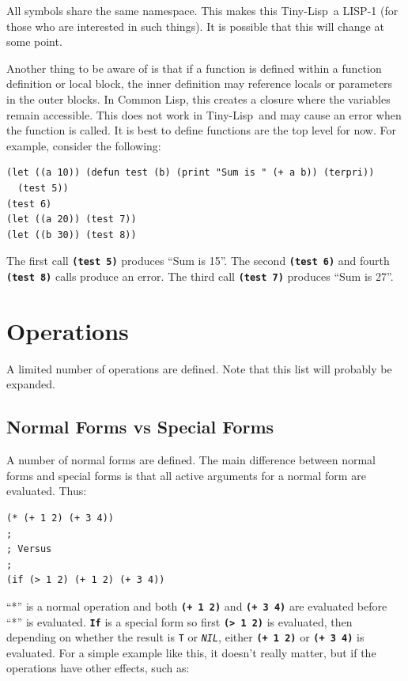 \documentclass[10pt, openany]{book}
\newcommand{\operation}[1]{\textbf{\texttt{#1}}}
\newcommand{\function}[1]{\texttt{#1}}
\newcommand{\constant}[1]{\emph{\texttt{#1}}}
\newcommand{\tl}{Tiny-Lisp}
\newcommand{\cl}{Common Lisp}
\begin{document}
All symbols share the same namespace.  This makes this \tl\ a LISP-1 (for those who are interested in such things).  It is possible that this will change at some point.

Another thing to be aware of is that if a function is defined within a function definition or local block, the inner definition may reference locals or parameters in the outer blocks.  In \cl, this creates a closure where the variables remain accessible.  This does not work in \tl\ and may cause an error when the function is called.  It is best to define functions are the top level for now.  For example, consider the following:
\begin{lstlisting}
(let ((a 10)) (defun test (b) (print "Sum is " (+ a b)) (terpri))
  (test 5))
(test 6)
(let ((a 20)) (test 7))
(let ((b 30)) (test 8))
\end{lstlisting}

The first call \operation{(test 5)} produces ``Sum is  15''.  The second \operation{(test 6)} and fourth \operation{(test 8)} calls produce an error.  The third call \operation{(test 7)} produces ``Sum is  27''.

\section{Operations}
A limited number of operations are defined.  Note that this list will probably be expanded.

\subsection{Normal Forms vs Special Forms}
A number of normal forms are defined.  The main difference between normal forms and special forms is that all active arguments for a normal form are evaluated.  Thus:
\begin{lstlisting}
(* (+ 1 2) (+ 3 4))
;
; Versus
;
(if (> 1 2) (+ 1 2) (+ 3 4))
\end{lstlisting}
``*'' is a normal operation and both \operation{(+ 1 2)} and \operation{(+ 3 4)} are evaluated before ``*'' is evaluated.  \operation{If} is a special form so first \operation{(> 1 2)} is evaluated, then depending on whether the result is \function{T} or \constant{NIL}, either \operation{(+ 1 2)} or \operation{(+ 3 4)} is evaluated.  For a simple example like this, it doesn't really matter, but if the operations have other effects, such as:
\end{document}
